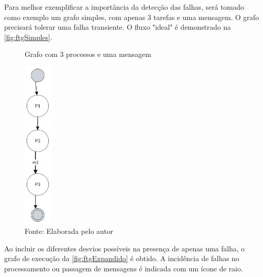 Para melhor exemplificar a importância da detecção das falhas, será tomado como exemplo um grafo simples, com apenas 3 tarefas e uma mensagem. O grafo precisará tolerar uma falha transiente. O fluxo "ideal" é demonstrado na \autoref{fig:ftgSimples}.

\begin{figure}[H]
    \centering
	\captionsetup{justification=centering}
    \caption{Grafo com 3 processos e uma mensagem}
    \includegraphics[width=0.120\textwidth]{assets/ftg_simples.png}
	\captionsetup{justification=raggedright}
    \caption*{Fonte: Elaborada pelo autor}
    \label{fig:ftgSimples}
\end{figure}

Ao incluir os diferentes desvios possíveis na presença de apenas uma falha, o grafo de execução da \autoref{fig:ftgExpandido} é obtido. A incidência de falhas no processamento ou passagem de mensagens é indicada com um ícone de raio.


